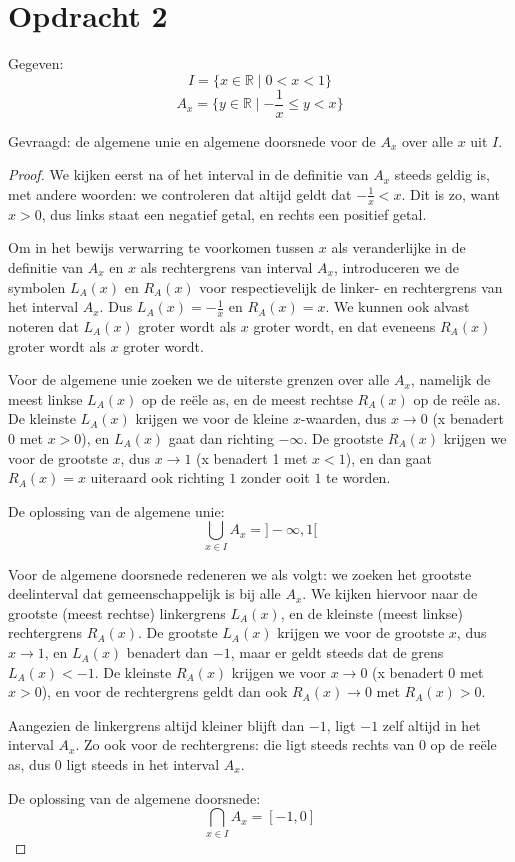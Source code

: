 \documentclass[hidequestions]{homework}
\begin{document}
\section*{Opdracht 2}

Gegeven: 
\[ I = \{x \in \mathbb{R} \mid  0<x<1\}\]
\[ A_x = \{ y \in \mathbb{R} \mid  -\frac{1}{x} \leq y < x \} \]

Gevraagd: de algemene unie en algemene doorsnede voor de $A_x$ over alle $x$ uit $I$. 

\begin{proof}

We kijken eerst na of het interval in de definitie van $A_x$ steeds geldig is, met andere woorden: 
we controleren dat altijd geldt dat $-\frac{1}{x} < x$. Dit is zo, want $x>0$, dus links staat een negatief getal, en rechts een positief getal. 

Om in het bewijs verwarring te voorkomen tussen $x$ als veranderlijke in de definitie van $A_x$ en $x$ als rechtergrens van interval $A_x$, 
introduceren we de symbolen $L_A(x)$ en $R_A(x)$  voor respectievelijk de linker- en rechtergrens van het interval $A_x$. Dus $L_A(x) = -\frac{1}{x}$ en $R_A(x)=x$. We kunnen ook alvast noteren dat $L_A(x)$ groter wordt als $x$ groter wordt, en dat eveneens $R_A(x)$ groter wordt als $x$ groter wordt. 

Voor de algemene unie zoeken we de uiterste grenzen over alle $A_x$, namelijk 
de meest linkse $L_A(x)$ op de re\"ele as, en de meest rechtse $R_A(x)$ op de re\"ele as. 
De kleinste $L_A(x)$ krijgen we voor de kleine $x$-waarden, dus $x\rightarrow 0$ (x benadert 0 met $x>0$), en $L_A(x)$  gaat dan richting $-\infty$.  
De grootste $R_A(x)$ krijgen we voor de grootste $x$, dus $x\rightarrow 1$ (x benadert 1 met $x<1$), en dan gaat $R_A(x)=x$ uiteraard ook richting $1$ zonder ooit $1$ te worden. 

De oplossing van de algemene unie: 
\[ \bigcup_{x \in I} A_x  = ]-\infty,1[    \]

Voor de algemene doorsnede redeneren we als volgt: we zoeken het grootste deelinterval dat gemeenschappelijk is bij alle $A_x$. 
We kijken hiervoor naar de grootste (meest rechtse) linkergrens $L_A(x)$, en de kleinste (meest linkse) rechtergrens $R_A(x)$. 
De grootste $L_A(x)$ krijgen we voor de grootste $x$, dus $x\rightarrow 1$, en $L_A(x)$ benadert dan $-1$, maar er geldt steeds dat de grens $L_A(x)<-1$. De kleinste $R_A(x)$ krijgen we voor $x\rightarrow 0$ (x benadert 0 met $x>0$), en voor de rechtergrens geldt dan ook $R_A(x)\rightarrow 0$ met $R_A(x)>0$. 

Aangezien de linkergrens altijd kleiner blijft dan $-1$, ligt $-1$ zelf altijd in het interval $A_x$. Zo ook voor de rechtergrens: die ligt steeds rechts van $0$ op de re\"ele as, dus $0$ ligt steeds in het interval $A_x$. 

De oplossing van de algemene doorsnede: 
\[ \bigcap_{x \in I} A_x = [-1, 0] \]

\end{proof}
\end{document}
